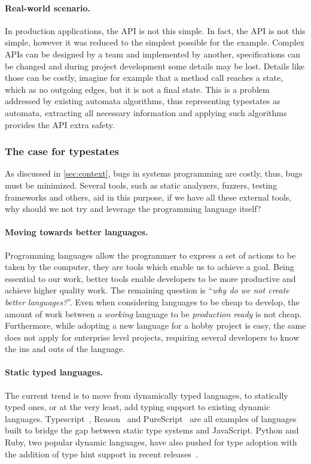 \paragraph{Real-world scenario.} In production applications, the API is not this simple.
In fact, the  API is not this simple, however it was reduced to the simplest possible for the example.
Complex APIs can be designed by a team and implemented by another,
specifications can be changed and during project development some details may be lost.
Details like those can be costly, imagine for example that a method call reaches a state, which as no outgoing edges,
but it is not a final state. This is a problem addressed by existing automata algorithms,
thus representing typestates as automata,
extracting all necessary information and applying such algorithms provides the API extra safety.

\subsubsection*{The case for typestates}

As discussed in \autoref{sec:context}, bugs in systems programming are costly,
thus, bugs must be minimized.
Several tools, such as static analyzers, fuzzers, testing frameworks and others,
aid in this purpose, if we have all these external tools,
why should we not try and leverage the programming language itself?

\paragraph{Moving towards better languages.}
Programming languages allow the programmer to express a set of actions to be taken by the computer,
they are tools which enable us to achieve a goal.
Being essential to our work, better tools enable developers to be more productive and achieve higher quality work.
The remaining question is “\emph{why do we not create better languages?}”.
Even when considering languages to be cheap to develop,
the amount of work between a \emph{working} language to be \emph{production ready} is not cheap.
Furthermore, while adopting a new language for a hobby project is easy,
the same does not apply for enterprise level projects,
requiring several developers to know the ins and outs of the language.

\paragraph{Static typed languages.}
The current trend is to move from dynamically typed languages,
to statically typed ones, or at the very least, add typing support to existing dynamic languages.
Typescript~\autocite{typescript},
Reason~\autocite{reason} and
PureScript~\autocite{purescript}
are all examples of languages built to bridge the gap between static type systems and JavaScript.
Python and Ruby, two popular dynamic languages, have also pushed for type adoption
with the addition of type hint support in recent
releases~\autocite{PythonTyping, RubyRBS}.

